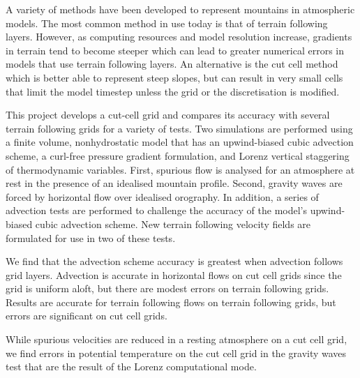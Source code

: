 A variety of methods have been developed to represent mountains in atmospheric models.  The most common method in use today is that of terrain following layers.  However, as computing resources and model resolution increase, gradients in terrain tend to become steeper which can lead to greater numerical errors in models that use terrain following layers.  An alternative is the cut cell method which is better able to represent steep slopes, but can result in very small cells that limit the model timestep unless the grid or the discretisation is modified.

This project develops a cut-cell grid and compares its accuracy with several terrain following grids for a variety of tests.  Two simulations are performed using a finite volume, nonhydrostatic model that has an upwind-biased cubic advection scheme, a curl-free pressure gradient formulation, and Lorenz vertical staggering of thermodynamic variables.  First, spurious flow is analysed for an atmosphere at rest in the presence of an idealised mountain profile.  Second, gravity waves are forced by horizontal flow over idealised orography.  In addition, a series of advection tests are performed to challenge the accuracy of the model's upwind-biased cubic advection scheme.  New terrain following velocity fields are formulated for use in two of these tests.

We find that the advection scheme accuracy is greatest when advection follows grid layers.  Advection is accurate in horizontal flows on cut cell grids since the grid is uniform aloft, but there are modest errors on terrain following grids.  Results are accurate for terrain following flows on terrain following grids, but errors are significant on cut cell grids.

While spurious velocities are reduced in a resting atmosphere on a cut cell grid, we find errors in potential temperature on the cut cell grid in the gravity waves test that are the result of the Lorenz computational mode.

